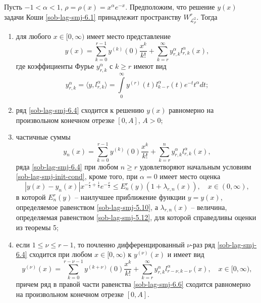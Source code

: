 \begin{theorem}\label{sob-lag-smj-ode-sob}
Пусть $-1<\alpha<1$, $\rho=\rho(x)=x^\alpha e^{-x}$. Предположим, что решение $y(x)$ задачи Коши \eqref{sob-lag-smj-6.1} принадлежит пространству  $W^r_{\mathcal{L}_{\rho}^2}$. Тогда
\begin{enumerate}[1)]
\item
для любого $x \in [0,\infty)$ имеет место представление
\begin{equation}\label{sob-lag-smj-6.4}
y(x)= \sum_{k=0}^{r-1} y^{(k)}(0)\frac{x^k}{k!}+ \sum_{k=r}^\infty y_{r,k}^\alpha l_{r,k}^\alpha(x),
\end{equation}
где коэффициенты Фурье $y_{r,k}^\alpha$ с $k \ge r$ имеют вид
\begin{equation}\label{sob-lag-smj-6.5}
y_{r,k}^\alpha=
\langle y, l^\alpha_{r,k} \rangle
=\int\limits_0^\infty y^{(r)}(t) l_{k-r}^\alpha(t)e^{-t}t^\alpha dt;
\end{equation}

\item
ряд \eqref{sob-lag-smj-6.4} сходится к решению $y(x)$ равномерно на произвольном конечном отрезке $[0,A]$, $A>0$;

\item
частичные суммы
\begin{equation}\label{sob-lag-smj-6.7}
y_{n}(x)= \sum_{k=0}^{r-1} y^{(k)}(0)\frac{x^k}{k!}+ \sum_{k=r}^n y_{r,k}^\alpha l_{r,k}^\alpha(x),
\end{equation}
ряда \eqref{sob-lag-smj-6.4} при любом $n \ge r$ удовлетворяют начальным условиям \eqref{sob-lag-smj-init-cond}, кроме того, при $\alpha=0$ имеет место оценка
\begin{equation}\label{sob-lag-smj-part-sum-est}
  |y(x)-y_n(x)|x^{-\frac r2+\frac14}e^{-\frac x2}\le E_n^r(y)(1+\lambda_{r,n}(x)), \quad x \in (0,\infty),
\end{equation}
в которой $E^r_n(y)$ -- наилучшее приближение функции $y = y(x)$, определяемое равенством \eqref{sob-lag-smj-5.10}, а $\lambda_{r,n}(x)$ -- величина, определяемая равенством \eqref{sob-lag-smj-5.12}, для которой справедливы оценки из теоремы 5;

\item
если $1\le\nu\le r-1$, то почленно дифференцированный $\nu$-раз ряд \eqref{sob-lag-smj-6.4} сходится при любом $x \in [0,\infty)$ к $y^{(\nu)}(x)$ и имеет вид
\begin{equation}\label{sob-lag-smj-6.6}
y^{(\nu)}(x)= \sum_{k=0}^{r-\nu-1} y^{(k+\nu)}(0)\frac{x^k}{k!}+ \sum_{k=r}^\infty y_{r,k}^\alpha l_{r-\nu,k-\nu}^\alpha(x),
\quad x \in [0, \infty),
\end{equation}
причем ряд в правой части равенства \eqref{sob-lag-smj-6.6} сходится равномерно на произвольном конечном отрезке $[0,A]$.

\end{enumerate}
\end{theorem}

